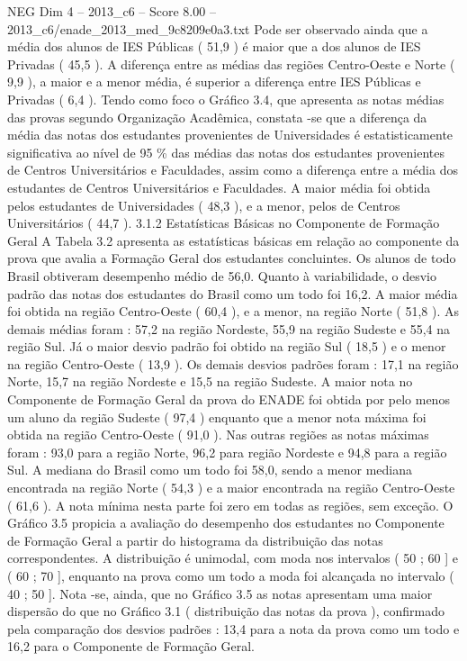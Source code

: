 \begin{textsample}{NEG Dim 4 – 2013\_c6 – Score 8.00 – 2013\_c6/enade\_2013\_med\_9c8209e0a3.txt}
Pode ser observado ainda que a média dos alunos de IES Públicas ( 51,9 ) é maior que a dos alunos de IES Privadas ( 45,5 ).
A diferença entre as médias das regiões Centro-Oeste e Norte ( 9,9 ), a maior e a menor média, é superior a diferença entre IES Públicas e Privadas ( 6,4 ).
Tendo como foco o Gráfico 3.4, que apresenta as notas médias das provas segundo Organização Acadêmica, constata -se que a diferença da média das notas dos estudantes provenientes de Universidades é estatisticamente significativa ao nível de 95 \% das médias das notas dos estudantes provenientes de Centros Universitários e Faculdades, assim como a diferença entre a média dos estudantes de Centros Universitários e Faculdades.
A maior média foi obtida pelos estudantes de Universidades ( 48,3 ), e a menor, pelos de Centros Universitários ( 44,7 ). 3.1.2 Estatísticas Básicas no Componente de Formação Geral A Tabela 3.2 apresenta as estatísticas básicas em relação ao componente da prova que avalia a Formação Geral dos estudantes concluintes.
Os alunos de todo Brasil obtiveram desempenho médio de 56,0.
Quanto à variabilidade, o desvio padrão das notas dos estudantes do Brasil como um todo foi 16,2.
A maior média foi obtida na região Centro-Oeste ( 60,4 ), e a menor, na região Norte ( 51,8 ).
As demais médias foram : 57,2 na região Nordeste, 55,9 na região Sudeste e 55,4 na região Sul.
Já o maior desvio padrão foi obtido na região Sul ( 18,5 ) e o menor na região Centro-Oeste ( 13,9 ).
Os demais desvios padrões foram : 17,1 na região Norte, 15,7 na região Nordeste e 15,5 na região Sudeste.
A maior nota no Componente de Formação Geral da prova do ENADE foi obtida por pelo menos um aluno da região Sudeste ( 97,4 ) enquanto que a menor nota máxima foi obtida na região Centro-Oeste ( 91,0 ).
Nas outras regiões as notas máximas foram : 93,0 para a região Norte, 96,2 para região Nordeste e 94,8 para a região Sul.
A mediana do Brasil como um todo foi 58,0, sendo a menor mediana encontrada na região Norte ( 54,3 ) e a maior encontrada na região Centro-Oeste ( 61,6 ).
A nota mínima nesta parte foi zero em todas as regiões, sem exceção.
O Gráfico 3.5 propicia a avaliação do desempenho dos estudantes no Componente de Formação Geral a partir do histograma da distribuição das notas correspondentes.
A distribuição é unimodal, com moda nos intervalos ( 50 ; 60 ] e ( 60 ; 70 ], enquanto na prova como um todo a moda foi alcançada no intervalo ( 40 ; 50 ].
Nota -se, ainda, que no Gráfico 3.5 as notas apresentam uma maior dispersão do que no Gráfico 3.1 ( distribuição das notas da prova ), confirmado pela comparação dos desvios padrões : 13,4 para a nota da prova como um todo e 16,2 para o Componente de Formação Geral.

\end{textsample}

